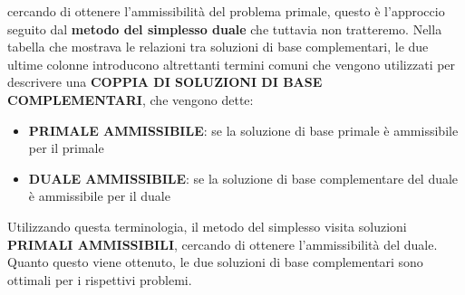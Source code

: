 \documentclass[12pt]{article}
\begin{document}
cercando di ottenere l'ammissibilità del problema primale, questo è l'approccio seguito dal \textbf{metodo del simplesso duale} che tuttavia non tratteremo.
Nella tabella che mostrava le relazioni tra soluzioni di base complementari, le due ultime colonne introducono altrettanti termini comuni che vengono utilizzati per descrivere una \textbf{COPPIA DI SOLUZIONI DI BASE COMPLEMENTARI}, che vengono dette:
\begin{itemize}
    \item \textbf{PRIMALE AMMISSIBILE}: se la soluzione di base primale è ammissibile per il primale
    \item \textbf{DUALE AMMISSIBILE}: se la soluzione di base complementare del duale è ammissibile per il duale
\end{itemize}
Utilizzando questa terminologia, il metodo del simplesso visita soluzioni \textbf{PRIMALI AMMISSIBILI}, cercando di ottenere l'ammissibilità del duale.
Quanto questo viene ottenuto, le due soluzioni di base complementari sono ottimali per i rispettivi problemi.
\end{document}
